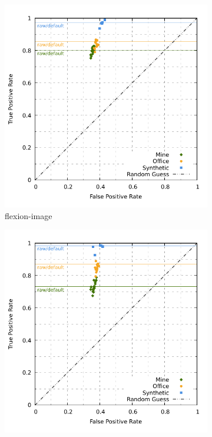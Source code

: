 \begin{figure}[ht]
\begin{subfigure}[t]{0.45\linewidth}
    \includegraphics[width=\linewidth]{chapter06/results/SIFT/flexion/roc.pdf}%
    \caption{\gls{flexion-image}}
\end{subfigure}\quad
\begin{subfigure}[t]{0.45\linewidth}
    \includegraphics[width=\linewidth]{chapter06/results/SIFT/bearing/roc.pdf}

\end{subfigure}
\end{figure}
